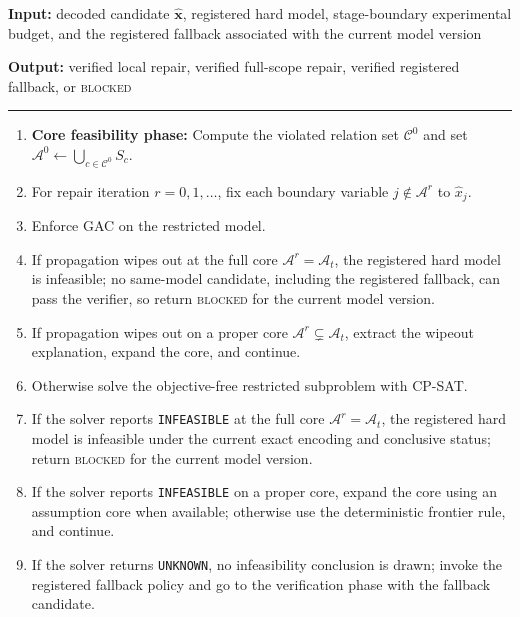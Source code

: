\documentclass[pdflatex,sn-mathphys-num,iicol,oneside]{sn-jnl}
\newcommand{\algin}[1]{\textbf{Input:} #1\par}
\newcommand{\algout}[1]{%
  \textbf{Output:} #1\par
  \vspace{2pt}\hrule\vspace{3pt}%
}
\newenvironment{algsteps}
  {\begin{enumerate}[
      leftmargin=1.8em,
      itemsep=1pt,
      parsep=0pt,
      topsep=2pt,
      label=\arabic*:
    ]}
  {\end{enumerate}}
\newcommand{\gac}{\textsc{GAC}\xspace}
\newcommand{\cpsat}{\textsc{CP-SAT}\xspace}
\begin{document}
\begin{algorithm}[H]
\caption{Explanation-guided repair-core expansion}
\label{alg:repair}
\small

\algin{
decoded candidate $\widehat{\bm{x}}$,
registered hard model,
stage-boundary experimental budget,
and the registered fallback associated with the current model version
}

\algout{
verified local repair,
verified full-scope repair,
verified registered fallback,
or \textsc{blocked}
}

\begin{algsteps}

\item \textbf{Core feasibility phase:} Compute the violated relation set $\mathcal{C}^{0}$ and set $\mathcal{A}^{0} \leftarrow \bigcup_{c\in\mathcal{C}^{0}}S_c$.

\item For repair iteration $r=0,1,\ldots$, fix each boundary variable $j\notin\mathcal{A}^{r}$ to $\widehat{x}_j$.

\item Enforce \gac on the restricted model.

\item If propagation wipes out at the full core $\mathcal{A}^{r}=\mathcal{A}_t$, the registered hard model is infeasible; no same-model candidate, including the registered fallback, can pass the verifier, so return \textsc{blocked} for the current model version.

\item If propagation wipes out on a proper core $\mathcal{A}^{r}\subsetneq\mathcal{A}_t$, extract the wipeout explanation, expand the core, and continue.

\item Otherwise solve the objective-free restricted subproblem with \cpsat.

\item If the solver reports \texttt{INFEASIBLE} at the full core $\mathcal{A}^{r}=\mathcal{A}_t$, the registered hard model is infeasible under the current exact encoding and conclusive status; return \textsc{blocked} for the current model version.

\item If the solver reports \texttt{INFEASIBLE} on a proper core, expand the core using an assumption core when available; otherwise use the deterministic frontier rule, and continue.

\item If the solver returns \texttt{UNKNOWN}, no infeasibility conclusion is drawn; invoke the registered fallback policy and go to the verification phase with the fallback candidate.


\end{algsteps}
\end{algorithm}
\end{document}

